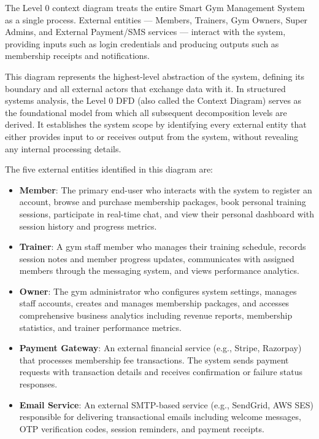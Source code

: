 \documentclass[
  12pt,
  a4paperpaper,
]{report}
\providecommand{\tightlist}{%
  \setlength{\itemsep}{0pt}\setlength{\parskip}{0pt}}
\begin{document}
\medskip\noindent
The Level 0 context diagram treats the entire Smart Gym Management System as a single process. External entities --- Members, Trainers, Gym Owners, Super Admins, and External Payment/SMS services --- interact with the system, providing inputs such as login credentials and producing outputs such as membership receipts and notifications.

This diagram represents the highest-level abstraction of the system, defining its boundary and all external actors that exchange data with it. In structured systems analysis, the Level 0 DFD (also called the Context Diagram) serves as the foundational model from which all subsequent decomposition levels are derived. It establishes the system scope by identifying every external entity that either provides input to or receives output from the system, without revealing any internal processing details.

The five external entities identified in this diagram are:

\begin{itemize}
\tightlist
\item
  \textbf{Member}: The primary end-user who interacts with the system to register an account, browse and purchase membership packages, book personal training sessions, participate in real-time chat, and view their personal dashboard with session history and progress metrics.
\item
  \textbf{Trainer}: A gym staff member who manages their training schedule, records session notes and member progress updates, communicates with assigned members through the messaging system, and views performance analytics.
\item
  \textbf{Owner}: The gym administrator who configures system settings, manages staff accounts, creates and manages membership packages, and accesses comprehensive business analytics including revenue reports, membership statistics, and trainer performance metrics.
\item
  \textbf{Payment Gateway}: An external financial service (e.g., Stripe, Razorpay) that processes membership fee transactions. The system sends payment requests with transaction details and receives confirmation or failure status responses.
\item
  \textbf{Email Service}: An external SMTP-based service (e.g., SendGrid, AWS SES) responsible for delivering transactional emails including welcome messages, OTP verification codes, session reminders, and payment receipts.
\end{itemize}
\end{document}
